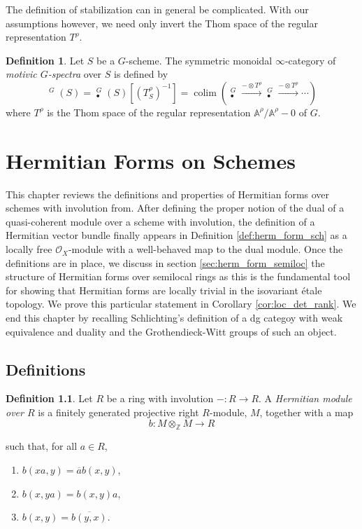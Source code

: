 \documentclass[edeposit,fullpage]{uiucthesis2009}
\newcommand{\Z}{\mathbb Z}
\newcommand{\mbb}{\mathbb}
\newcommand{\mc}{\mathcal}
\DeclareMathOperator*{\colim}{colim}
\DeclareMathOperator{\SH}{\underline{SH}}
\DeclareMathOperator{\HH}{\underline{H}}
\theoremstyle{plain}
\numberwithin{lemma}{section}
\theoremstyle{definition}
\newtheorem{definition}[lemma]{Definition}
\begin{document}
The definition of stabilization can in general be complicated. With
our assumptions however, we need only invert the Thom space of the
regular representation $T^\rho$.

\begin{definition}
Let $S$ be a $G$-scheme. The symmetric monoidal $\infty$-category of
\emph{motivic $G$-spectra} over $S$ is defined by 
\[
\SH^G(S) = \HH_\bullet^G(S)[( T^{\rho}_S)^{-1}] = \colim
\left(\HH_\bullet^G \xrightarrow{-\otimes T^\rho} \HH_\bullet^G
  \xrightarrow{-\otimes T^\rho} \cdots \right)
\]
where $T^\rho$ is the Thom space of the regular
representation $\mbb A^\rho/\mbb A^\rho - 0$ of $G$.
\end{definition}

\chapter{Hermitian Forms on Schemes}\label{chap:herm_form_sch}

This chapter reviews the definitions and properties of Hermitian forms over schemes
with involution from\cite{Xie2018ATM}. After defining the proper
notion of the dual of a quasi-coherent module over a scheme with involution, the definition of a Hermitian vector bundle finally
appears in Definition \ref{def:herm_form_sch} as a locally free $\mc
O_X$-module with a well-behaved map to the dual module. Once the
definitions are in place, we discuss in section
\ref{sec:herm_form_semiloc} the structure of Hermitian forms over
semilocal rings as this is the fundamental tool for showing that Hermitian forms
are locally trivial in the isovariant \'etale
topology. We prove this particular statement in Corollary
\ref{cor:loc_det_rank}. We end this chapter by recalling Schlichting's
definition of a dg categoy with weak equivalence and duality and the
Grothendieck-Witt groups of such an object.  

\section{Definitions}\label{sec:herm_def}

\begin{definition}
Let $R$ be a ring with involution $- : R \rightarrow R$. A \emph{Hermitian
module over $R$} is a finitely generated projective right $R$-module, $M$, together
with a map
\[
b : M \otimes_{\Z} M \rightarrow R
\]  

such that, for all $a \in R$,
\begin{enumerate}
\item $b(xa,y) = \overline a b(x,y)$,
\item $b(x,ya) = b(x,y) a$,
\item $b(x,y) = \overline{b(y,x)}$.
\end{enumerate}
\end{definition}
\end{document}

